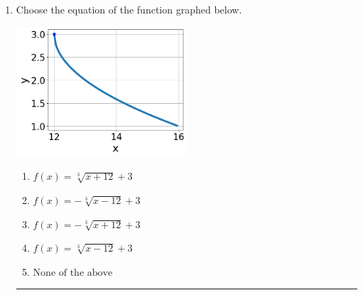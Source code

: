 \documentclass[14pt]{extbook}
\newcommand{\litem}[1]{\item#1\hspace*{-1cm}\rule{\textwidth}{0.4pt}}
\begin{document}
\begin{enumerate}
{\begin{enumerate}[label=\Alph*.]
\end{enumerate} }
\litem{
Choose the equation of the function graphed below.
\begin{center}
    \includegraphics[width=0.5\textwidth]{../Figures/radicalGraphToEquationB.png}
\end{center}
\begin{enumerate}[label=\Alph*.]
\item \( f(x) = \sqrt[3]{x + 12} + 3 \)
\item \( f(x) = - \sqrt[3]{x - 12} + 3 \)
\item \( f(x) = - \sqrt[3]{x + 12} + 3 \)
\item \( f(x) = \sqrt[3]{x - 12} + 3 \)
\item \( \text{None of the above} \)


\end{enumerate}}
\end{enumerate}
\end{document}
